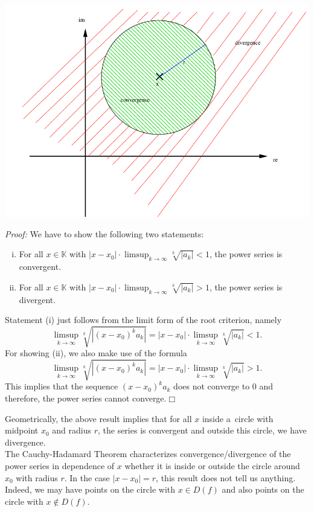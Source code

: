 \includegraphics{./power.png}

{\em Proof:} We have to show the following two statements:
\begin{enumerate}[(i)]
\item For all $x\in\mathbb{K}$ with $|x-x_0|\cdot \limsup_{k\rightarrow\infty} \sqrt[k]{|a_k|}<1$, the power series is convergent.
\item For all $x\in\mathbb{K}$ with $|x-x_0|\cdot \limsup_{k\rightarrow\infty} \sqrt[k]{|a_k|}>1$, the power series is divergent.
\end{enumerate}
Statement (i) just follows from the limit form of the root criterion, namely
\[\limsup_{k \rightarrow \infty} \sqrt[k]{|(x-x_0)^ka_k|}=|x-x_0|\cdot\limsup_{k \rightarrow \infty} \sqrt[k]{|a_k|}<1.\]
\whiteskip
For showing (ii), we also make use of the formula
\[\limsup_{k \rightarrow \infty} \sqrt[k]{|(x-x_0)^ka_k|}=|x-x_0|\cdot\limsup_{k \rightarrow \infty} \sqrt[k]{|a_k|}>1.\]
This implies that the sequence $(x-x_0)^ka_k$ does not converge to 0 and therefore, the power series cannot converge.\hfill$\Box$

Geometrically, the above result implies that for all $x$ inside a~circle with midpoint $x_0$ and radius $r$, 
the series is convergent and outside this circle, we have divergence.\\
The Cauchy-Hadamard Theorem characterizes convergence/divergence of the power series in dependence of $x$ whether it is inside 
or outside the circle around $x_0$ with radius $r$. In the case $|x-x_0|=r$, this result does not tell us anything. Indeed,
we may have points on the circle with $x\in D(f)$ and also points on the circle with $x\notin D(f)$. 


